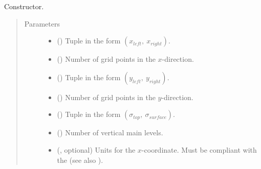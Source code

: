\documentclass[letterpaper,10pt,english]{sphinxmanual}
\begin{document}
\begin{fulllineitems}
\begin{quote}
\begin{description}
\begin{itemize}
\end{itemize}

\end{description}\end{quote}

\begin{fulllineitems}
\label{\detokenize{api:grids.sigma.Sigma3d.__init__}}
Constructor.
\begin{quote}\begin{description}
\item[{Parameters}] \leavevmode\begin{itemize}
\item {} 
 () \textendash{} Tuple in the form \((x_{left}, ~ x_{right})\).

\item {} 
 () \textendash{} Number of grid points in the \(x\)-direction.

\item {} 
 () \textendash{} Tuple in the form \((y_{left}, ~ y_{right})\).

\item {} 
 () \textendash{} Number of grid points in the \(y\)-direction.

\item {} 
 () \textendash{} Tuple in the form \((\sigma_{top}, ~ \sigma_{surface})\).

\item {} 
 () \textendash{} Number of vertical main levels.

\item {} 
 (, optional) \textendash{} 
Units for the \(x\)-coordinate. Must be compliant with the 
(see also {\hyperref[\detokenize{api:grids.axis.Axis.__init__}]{}}).



\end{itemize}
\end{description}
\end{quote}
\end{fulllineitems}
\end{fulllineitems}
\end{document}
